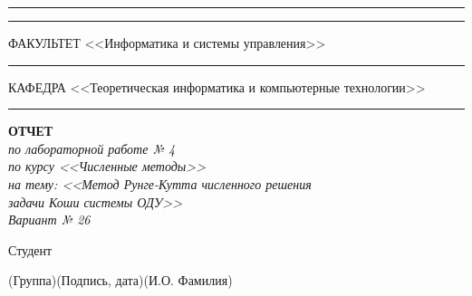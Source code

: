 \documentclass[14pt, russian]{scrartcl}
\begin{document}
\begin{titlepage}
	\vspace{-2pt}
	\hspace{-34.5pt}\rule{\textwidth}{2.5pt}

	\vspace*{-20.3pt}
	\hspace{-34.5pt}\rule{\textwidth}{0.4pt}

	\vspace{0.5ex}
	\noindent \small ФАКУЛЬТЕТ\hspace{80pt} <<Информатика и системы управления>>

	\vspace*{-16pt}
	\hspace{35pt}\rule{0.855\textwidth}{0.4pt}

	\vspace{0.5ex}
	\noindent \small КАФЕДРА\hspace{50pt} <<Теоретическая информатика и компьютерные технологии>>

	\vspace*{-16pt}
	\hspace{25pt}\rule{0.875\textwidth}{0.4pt}


	\vspace{3em}

	\begin{center}
		\textbf{ОТЧЕТ} \\\textit{по лабораторной работе № 4\\по курсу <<Численные методы>>\\на тему: <<Метод Рунге-Кутта численного решения\\ задачи Коши системы ОДУ>>\\Вариант № 26} \\
	\end{center}

	\vspace{\fill}


	\newlength{\ML}

	\noindent Студент \underline{} \hfill \underline{ \hspace{4cm}}\quad

	\vspace{-2.1ex}
	\noindent\hspace{9ex}\scriptsize{(Группа)}\normalsize\hspace{170pt}\hspace{2ex}\scriptsize{(Подпись, дата)}\normalsize\hspace{30pt}\hspace{6ex}\scriptsize{(И.О. Фамилия)}\normalsize


\end{titlepage}
\end{document}

